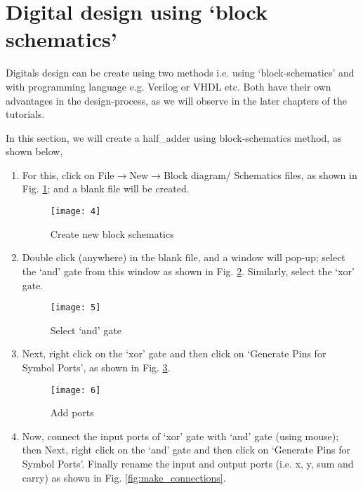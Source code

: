 \section{ Digital design using `block schematics'}
Digitals design can be create using two methods i.e. using `block-schematics' and with programming language e.g. Verilog or VHDL etc. Both have their own advantages in the design-process, as we will observe in the later chapters of the tutorials. 

In this section, we will create a half\_adder using block-schematics method, as shown below,

\begin{enumerate}
	
	\item For this, click on File$\rightarrow$New$\rightarrow$Block diagram/ Schematics files, as shown in Fig. \ref{fig:block_schematics}; and a blank file will be created.
	
	\begin{figure}
		\centering
		\texttt{[image: 4]}
		\caption{Create new block schematics}
		\label{fig:block_schematics}
	\end{figure}
	
	\item Double click (anywhere) in the blank file, and a window will pop-up; select the `and' gate from this window as shown in Fig. \ref{fig:select_gate}. Similarly, select the `xor' gate. 
	
	\begin{figure}
		\centering
		\texttt{[image: 5]}
		\caption{Select `and' gate}
		\label{fig:select_gate}
	\end{figure}
	
	\item Next, right click on the `xor' gate and then click on `Generate Pins for Symbol Ports', as shown in Fig. \ref{fig:add_pins}. 
	
	\begin{figure}
		\centering
		\texttt{[image: 6]}
		\caption{Add ports}
		\label{fig:add_pins}
	\end{figure}
	
	\item Now, connect the input ports of `xor' gate with `and' gate (using mouse); then Next, right click on the `and' gate and then click on `Generate Pins for Symbol Ports'. Finally rename the input and output ports (i.e. x, y, sum and carry) as shown in Fig. \ref{fig:make_connections}. 
	

\end{enumerate}
